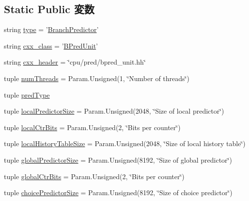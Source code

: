 \subsection*{Static Public 変数}
\begin{DoxyCompactItemize}
\item 
string \hyperlink{classBranchPredictor_1_1BranchPredictor_acce15679d830831b0bbe8ebc2a60b2ca}{type} = '\hyperlink{classBranchPredictor_1_1BranchPredictor}{BranchPredictor}'
\item 
string \hyperlink{classBranchPredictor_1_1BranchPredictor_a58cd55cd4023648e138237cfc0822ae3}{cxx\_\-class} = '\hyperlink{classBPredUnit}{BPredUnit}'
\item 
string \hyperlink{classBranchPredictor_1_1BranchPredictor_a17da7064bc5c518791f0c891eff05fda}{cxx\_\-header} = \char`\"{}cpu/pred/bpred\_\-unit.hh\char`\"{}
\item 
tuple \hyperlink{classBranchPredictor_1_1BranchPredictor_aac03a586f9fcb28bcbe8c3721888fa93}{numThreads} = Param.Unsigned(1, \char`\"{}Number of threads\char`\"{})
\item 
tuple \hyperlink{classBranchPredictor_1_1BranchPredictor_a21f1c740ec019f8327179a37b26cc7a3}{predType}
\item 
tuple \hyperlink{classBranchPredictor_1_1BranchPredictor_ac2af65faa5d32c894af40e4477fbfe65}{localPredictorSize} = Param.Unsigned(2048, \char`\"{}Size of local predictor\char`\"{})
\item 
tuple \hyperlink{classBranchPredictor_1_1BranchPredictor_a2da1de2b433849a9666f13cf821c1539}{localCtrBits} = Param.Unsigned(2, \char`\"{}Bits per counter\char`\"{})
\item 
tuple \hyperlink{classBranchPredictor_1_1BranchPredictor_a711db16eca8627517aca59fb2aa5565b}{localHistoryTableSize} = Param.Unsigned(2048, \char`\"{}Size of local history table\char`\"{})
\item 
tuple \hyperlink{classBranchPredictor_1_1BranchPredictor_ae96feffd947249a9c9cd50de8d89ef9e}{globalPredictorSize} = Param.Unsigned(8192, \char`\"{}Size of global predictor\char`\"{})
\item 
tuple \hyperlink{classBranchPredictor_1_1BranchPredictor_a94aef0cf23359796beb413a3078186ef}{globalCtrBits} = Param.Unsigned(2, \char`\"{}Bits per counter\char`\"{})
\item 
tuple \hyperlink{classBranchPredictor_1_1BranchPredictor_acd59ddeaa888aee8a086f93d0ce0afbc}{choicePredictorSize} = Param.Unsigned(8192, \char`\"{}Size of choice predictor\char`\"{})
\item 

\end{DoxyCompactItemize}
